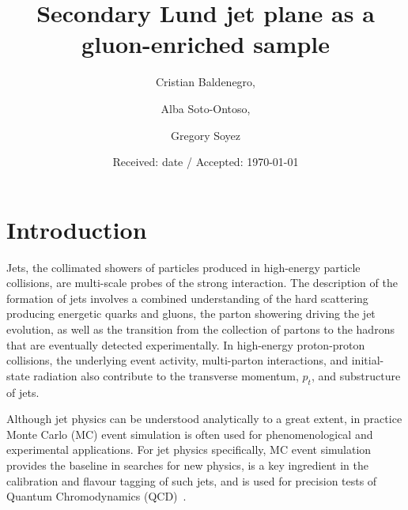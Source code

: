 \documentclass[a4paper,11pt]{article}
\title{Secondary Lund jet plane as a gluon-enriched sample}
\author[a]{Cristian Baldenegro,}
\author[b]{Alba Soto-Ontoso,}
\author[c]{Gregory Soyez}
\affiliation[a]{\MITaff}
\affiliation[b]{\UGRaff}
\affiliation[c]{\CNRSaff}
\date{Received: date / Accepted: \today}
\begin{document}
\maketitle

\section{Introduction}

Jets, the collimated showers of particles produced in high-energy particle collisions, are multi-scale probes of the strong interaction. The description of the formation of jets involves a combined understanding of the hard scattering producing energetic quarks and gluons, the parton showering driving the jet evolution, as well as the transition from the collection of partons to the hadrons that are eventually detected experimentally. In high-energy proton-proton collisions, the underlying event activity, multi-parton interactions, and initial-state radiation also contribute to the transverse momentum, $p_t$, and substructure of jets.

Although jet physics can be understood analytically to a great extent, in practice Monte Carlo (MC) event simulation is often used for phenomenological and experimental applications. For jet physics specifically, MC event simulation provides the baseline in searches for new physics, is a key ingredient in the calibration and flavour tagging of such jets, and is used for precision tests of Quantum Chromodynamics (QCD)~\cite{Campbell:2022qmc}.
\end{document}
